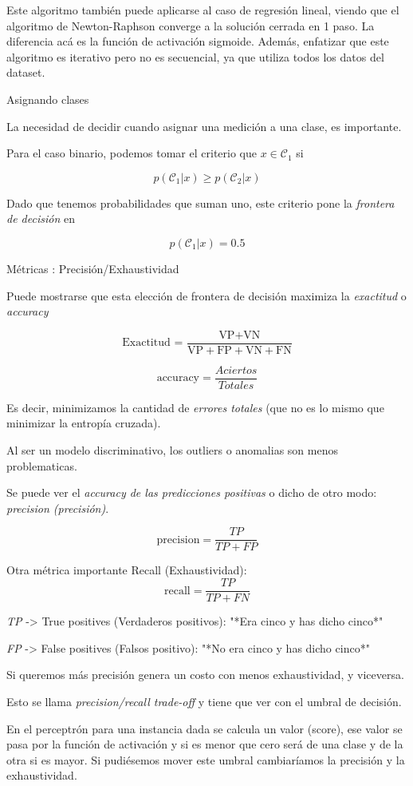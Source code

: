 \documentclass[twoside,11pt]{article}
\begin{document}
Este algoritmo también puede aplicarse al caso de regresión lineal, viendo que el algoritmo 
de Newton-Raphson converge a la solución cerrada en 1 paso. La diferencia acá es la función 
de activación sigmoide. Además, enfatizar que este algoritmo es iterativo pero no es secuencial, 
ya que utiliza todos los datos del dataset.

Asignando clases

La necesidad de decidir cuando asignar una medición a una clase, es importante.

Para el caso binario, podemos tomar el criterio que $x\in\mathcal{C}_1$ si

$$p(\mathcal{C}_{1}|x)\geq p(\mathcal{C}_{2}|x)$$

Dado que tenemos probabilidades que suman uno, este criterio pone la \textit{frontera de decisión} en

$$p(\mathcal{C}_{1}|x)=0.5$$

Métricas : Precisión/Exhaustividad

Puede mostrarse que esta elección de frontera de decisión maximiza la \textit{exactitud} o \textit{accuracy}

$$\text{Exactitud = }\frac{\text{VP}+\text{VN}}{\text{VP}+\text{FP}+\text{VN}+\text{FN}}$$

$$
\mathrm{accuracy} = \frac{Aciertos}{Totales}
$$

Es decir, minimizamos la cantidad de \textit{errores totales} (que no es lo mismo que minimizar la entropía cruzada).

Al ser un modelo discriminativo, los outliers o anomalias son menos problematicas.

Se puede ver el \textit{accuracy de las predicciones positivas} o dicho de otro modo: \textit{precision (precisión)}.

$$
\mathrm{precision} = \frac{TP}{TP + FP}
$$

Otra métrica importante Recall (Exhaustividad):
$$
\mathrm{recall} = \frac{TP}{TP + FN}
$$

\textit{TP} -> True positives (Verdaderos positivos): "*Era cinco y has dicho cinco*"

\textit{FP} -> False positives (Falsos positivo): "*No era cinco y has dicho cinco*"

Si queremos más precisión genera un costo con menos exhaustividad, y viceversa.

Esto se llama \textit{precision/recall trade-off} y tiene que ver con el umbral de decisión. 

En el perceptrón para una instancia dada se calcula un valor (score), ese valor se pasa por 
la función de activación y si es menor que cero será de una clase y de la otra si es mayor. 
Si pudiésemos mover este umbral cambiaríamos la precisión y la exhaustividad.
\end{document}
